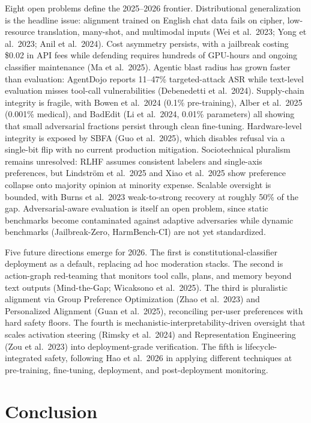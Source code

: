 \documentclass{article}
\begin{document}
Eight open problems define the 2025--2026 frontier. Distributional generalization is the headline issue: alignment trained on English chat data fails on cipher, low-resource translation, many-shot, and multimodal inputs (Wei et al.~2023; Yong et al.~2023; Anil et al.~2024). Cost asymmetry persists, with a jailbreak costing \$0.02 in API fees while defending requires hundreds of GPU-hours and ongoing classifier maintenance (Ma et al.~2025). Agentic blast radius has grown faster than evaluation: AgentDojo reports 11--47\% targeted-attack ASR while text-level evaluation misses tool-call vulnerabilities (Debenedetti et al.~2024). Supply-chain integrity is fragile, with Bowen et al.~2024 (0.1\% pre-training), Alber et al.~2025 (0.001\% medical), and BadEdit (Li et al.~2024, 0.01\% parameters) all showing that small adversarial fractions persist through clean fine-tuning. Hardware-level integrity is exposed by SBFA (Guo et al.~2025), which disables refusal via a single-bit flip with no current production mitigation. Sociotechnical pluralism remains unresolved: RLHF assumes consistent labelers and single-axis preferences, but Lindström et al.~2025 and Xiao et al.~2025 show preference collapse onto majority opinion at minority expense. Scalable oversight is bounded, with Burns et al.~2023 weak-to-strong recovery at roughly 50\% of the gap. Adversarial-aware evaluation is itself an open problem, since static benchmarks become contaminated against adaptive adversaries while dynamic benchmarks (Jailbreak-Zero, HarmBench-CI) are not yet standardized.

Five future directions emerge for 2026. The first is constitutional-classifier deployment as a default, replacing ad hoc moderation stacks. The second is action-graph red-teaming that monitors tool calls, plans, and memory beyond text outputs (Mind-the-Gap; Wicaksono et al.~2025). The third is pluralistic alignment via Group Preference Optimization (Zhao et al.~2023) and Personalized Alignment (Guan et al.~2025), reconciling per-user preferences with hard safety floors. The fourth is mechanistic-interpretability-driven oversight that scales activation steering (Rimsky et al.~2024) and Representation Engineering (Zou et al.~2023) into deployment-grade verification. The fifth is lifecycle-integrated safety, following Hao et al.~2026 in applying different techniques at pre-training, fine-tuning, deployment, and post-deployment monitoring.

\section{Conclusion}\label{conclusion}
\end{document}
